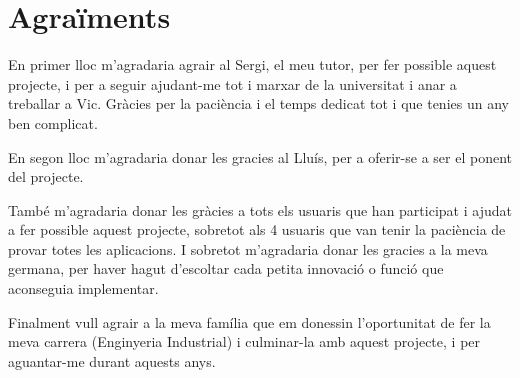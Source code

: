 \chapter{Agraïments}

En primer lloc m'agradaria agrair al Sergi, el meu tutor, per fer possible aquest projecte, i per a seguir ajudant-me tot i marxar de la universitat i anar a treballar a Vic. Gràcies per la paciència i el temps dedicat tot i que tenies un any ben complicat.

En segon lloc m'agradaria donar les gracies al Lluís, per a oferir-se a ser el ponent del projecte.

També m'agradaria donar les gràcies a tots els usuaris que han participat i ajudat a fer possible aquest projecte, sobretot als 4 usuaris que van tenir la paciència de provar totes les aplicacions. I sobretot m'agradaria donar les gracies a la meva germana, per haver hagut d'escoltar cada petita innovació o funció que aconseguia implementar. 

Finalment vull agrair a la meva família que em donessin l'oportunitat de fer la meva carrera (Enginyeria Industrial) i culminar-la amb aquest projecte, i per aguantar-me durant aquests anys.

